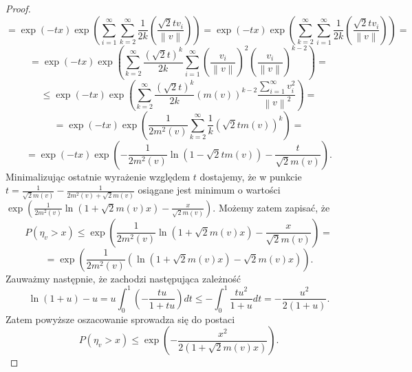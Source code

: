 \documentclass{article}
\newcommand{\norm}[1]{\left\lVert#1\right\rVert}
\begin{document}
\begin{proof}
\begin{displaymath}
\end{displaymath}
\begin{displaymath}
=\exp(-tx)\exp \left(\sum_{i=1}^{\infty}\sum_{k=2}^{\infty}\frac{1}{2k}\left(\frac{\sqrt{2}tv_i}{\norm{v}}\right)\right)=\exp(-tx)\exp \left(\sum_{k=2}^{\infty}\sum_{i=1}^{\infty}\frac{1}{2k}\left(\frac{\sqrt{2}tv_i}{\norm{v}}\right)\right)=
\end{displaymath}
\begin{displaymath}
=\exp(-tx)\exp \left(\sum_{k=2}^{\infty}\frac{(\sqrt{2}t)^k}{2k}\sum_{i=1}^{\infty}\left(\frac{v_i}{\norm{v}}\right)^2\left(\frac{v_i}{\norm{v}}\right)^{k-2}\right)=
\end{displaymath}
\begin{displaymath}
\leq \exp(-tx)\exp \left(\sum_{k=2}^{\infty}\frac{(\sqrt{2}t)^k}{2k}(m(v))^{k-2}\frac{\sum_{i=1}^{\infty}v_i^2}{\norm{v}^2}\right)=
\end{displaymath}
\begin{displaymath}
=\exp(-tx)\exp \left(\frac{1}{2m^2(v)}\sum_{k=2}^{\infty}\frac{1}{k}\left(\sqrt{2}tm(v)\right)^k\right)=
\end{displaymath}
\begin{displaymath}
=\exp(-tx)\exp \left(-\frac{1}{2m^2(v)}\ln \left(1-\sqrt{2}tm(v)\right)-\frac{t}{\sqrt{2}m(v)}\right).
\end{displaymath}
Minimalizując ostatnie wyrażenie względem $t$ dostajemy, że w punkcie $t=\frac{1}{\sqrt{2}m(v)}-\frac{1}{2m^2(v)+\sqrt{2}m(v)}$ osiągane jest minimum o wartości $\exp\left(\frac{1}{2m^2(v)}\ln \left(1+\sqrt{2}m(v)x\right)-\frac{x}{\sqrt{2}m(v)}\right)$. Możemy zatem zapisać, że
\begin{displaymath}
P(\eta_v>x)\leq \exp\left(\frac{1}{2m^2(v)}\ln \left(1+\sqrt{2}m(v)x\right)-\frac{x}{\sqrt{2}m(v)}\right)=
\end{displaymath}
\begin{displaymath}
=\exp\left(\frac{1}{2m^2(v)}\left(\ln \left(1+\sqrt{2}m(v)x\right)-\sqrt{2}m(v)x\right)\right).
\end{displaymath}
Zauważmy następnie, że zachodzi następująca zależność
\begin{displaymath}
\ln(1+u)-u=u\int_0^1\left(-\frac{tu}{1+tu}\right)dt\leq -\int_0^1\frac{tu^2}{1+u}dt=-\frac{u^2}{2(1+u)}.
\end{displaymath}Zatem powyższe oszacowanie sprowadza się do postaci 
\begin{displaymath}
P(\eta_v>x)\leq \exp\left(-\frac{x^2}{2(1+\sqrt{2}m(v)x)}\right).
\end{displaymath}

\end{proof}
\end{document}
